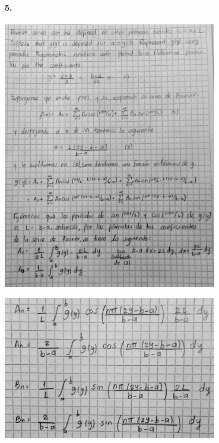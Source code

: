 \documentclass{article}
\begin{document}
\paragraph{5.}
\begin{center}
	\includegraphics[width=0.7\textwidth]{img/5.jpeg}
\end{center}
\begin{center}
	\includegraphics[width=0.7\textwidth]{img/5-2.jpeg}
\end{center}
\end{document}
